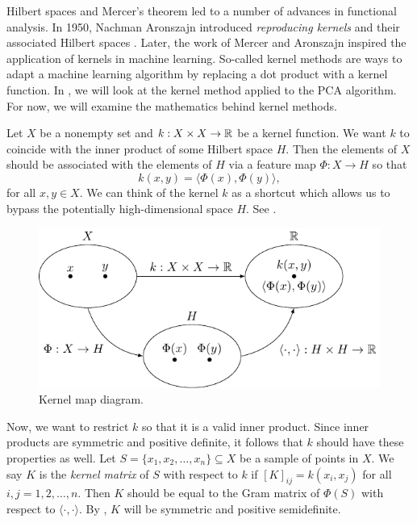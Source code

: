 Hilbert spaces and Mercer's theorem led to a number of advances in functional analysis.
In 1950, Nachman Aronszajn introduced \textit{reproducing kernels} and their associated Hilbert spaces \cite{aronszajn1950theory}.
Later, the work of Mercer and Aronszajn inspired the application of kernels in machine learning.
So-called kernel methods are ways to adapt a machine learning algorithm by replacing a dot product with a kernel function.
In , we will look at the kernel method applied to the PCA algorithm.
For now, we will examine the mathematics behind kernel methods.

Let \(X\) be a nonempty set and \(k : X \times X \to \mathbb{R}\) be a kernel function.
We want \(k\) to coincide with the inner product of some Hilbert space \(H\).
Then the elements of \(X\) should be associated with the elements of \(H\) via a feature map \(\Phi : X \to H\) so that
\begin{equation}
    \label{eqn:kernel-inner-product-1}
    k(x,y) = \langle \Phi(x), \Phi(y) \rangle,
\end{equation}
for all \(x, y \in X\).
We can think of the kernel \(k\) as a shortcut which allows us to bypass the potentially high-dimensional space \(H\).
See .

\begin{figure}
    \centering
    \includegraphics[]{figs/fig-kernel-map-diagram}
    \caption{Kernel map diagram.}
    \label{fig:kernel-map-diagram}
\end{figure}


Now, we want to restrict \(k\) so that it is a valid inner product.
Since inner products are symmetric and positive definite, it follows that \(k\) should have these properties as well.
Let \(S = \{x_1, x_2, \dots, x_n\} \subseteq X\) be a sample of points in \(X\).
We say \(K\) is the \textit{kernel matrix} of \(S\) with respect to \(k\) if \([K]_{ij} = k(x_i, x_j)\) for all \(i,j = 1,2,\dots, n\).
Then \(K\) should be equal to the Gram matrix of \(\Phi(S)\) with respect to \(\langle \cdot, \cdot \rangle\).
By , \(K\) will be symmetric and positive semidefinite.

